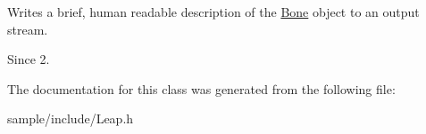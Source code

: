Writes a brief, human readable description of the \hyperlink{class_leap_1_1_bone}{Bone} object to an output stream.

\begin{DoxySince}{Since}
2. 
\end{DoxySince}


The documentation for this class was generated from the following file\+:\begin{DoxyCompactItemize}
\item 
sample/include/Leap.\+h\end{DoxyCompactItemize}
